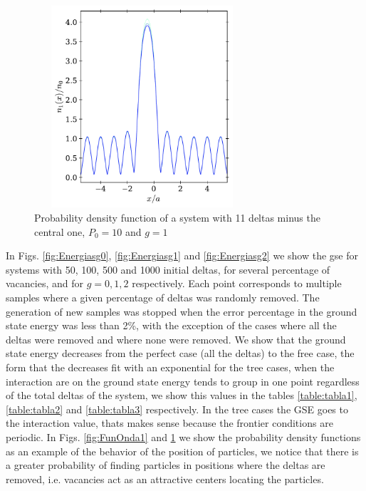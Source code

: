\documentclass[twocolumn,showpacs,showkeys,preprintnumbers,superscriptaddress, pra, 10pt, aps]{revtex4-2}
\begin{document}
\begin{figure}[H]
  \begin{center}
    \includegraphics[height=7.5cm, width=8.0cm]{g=1.pdf}
  \end{center}
  \vspace{-0.5cm}
  \caption{Probability density function of a system with 11 deltas minus the central one, $P_0=10$
    and $g=1$}%
  \label{fig:FunOnda2}
\end{figure}

In Figs. \ref{fig:Energiasg0}, \ref{fig:Energiasg1} and \ref{fig:Energiasg2} we show the gse %
for systems with 50, 100, 500 and 1000 initial deltas, for several percentage of vacancies, and for $g=0, 1, 2$ respectively. Each point corresponds to multiple samples where a given percentage of deltas was randomly removed. The
generation of new samples was stopped when the error percentage in the ground state energy was less
than 2\%, with the exception of the cases where all the deltas were removed and where none were
removed. We show that the ground state energy decreases from the perfect case (all the deltas) to the free case, the form that the decreases fit with an exponential for the tree cases, when the interaction are on the ground state energy tends to group in one point  regardless of the total deltas of the system, we show this values in the tables \ref{table:tabla1}, \ref{table:tabla2} and \ref{table:tabla3} respectively.  In the tree cases the GSE goes to the interaction value, thats makes sense because the frontier conditions are periodic. In Figs. \ref{fig:FunOnda1} and \ref{fig:FunOnda2} we show the probability density functions as an example of the behavior of the position of particles, we notice that there is a greater probability of finding particles in positions where the deltas are removed, i.e. vacancies act as an attractive centers locating the particles.
\end{document}
